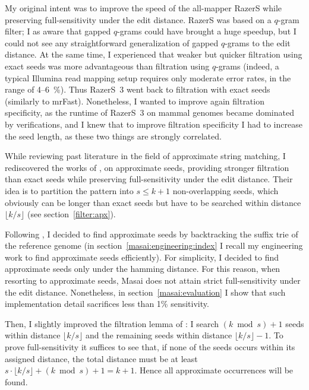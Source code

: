 My original intent was to improve the speed of the all-mapper RazerS \citep{Weese2009} while preserving full-sensitivity under the edit distance.
RazerS was based on a $q$-gram filter;
I as aware that gapped $q$-grams could have brought a huge speedup, but I could not see any straightforward generalization of gapped $q$-grams to the edit distance.
At the same time, I experienced that weaker but quicker filtration using exact seeds was more advantageous than filtration using $q$-grams (indeed, a typical Illumina read mapping setup requires only moderate error rates, in the range of 4--6~\%).
Thus RazerS~3 \citep{Weese2012} went back to filtration with exact seeds (similarly to mrFast).
Nonetheless, I wanted to improve again filtration specificity, as the runtime of RazerS~3 on mammal genomes became dominated by verifications, and I knew that to improve filtration specificity I had to increase the seed length, as these two things are strongly correlated.

While reviewing past literature in the field of approximate string matching, I rediscovered the works of \citeauthor{Myers1994}, \citeauthor{Navarro2000} on approximate seeds, providing stronger filtration than exact seeds while preserving full-sensitivity under the edit distance.
Their idea is to partition the pattern into $s \leq k+1$ non-overlapping seeds, which obviously can be longer than exact seeds but have to be searched within distance $\lfloor k/s \rfloor$ (see section~\ref{filter:apx}).

Following \citep{Navarro2000}, I decided to find approximate seeds by backtracking the suffix trie of the reference genome (in section~\ref{masai:engineering:index} I recall my engineering work to find approximate seeds efficiently).
For simplicity, I decided to find approximate seeds only under the hamming distance.
For this reason, when resorting to approximate seeds, Masai does not attain strict full-sensitivity under the edit distance.
Nonetheless, in section~\ref{masai:evaluation} I show that such implementation detail sacrifices less than 1\% sensitivity.

Then, I slightly improved the filtration lemma of \citep{Navarro2000}:
I search $(k \bmod{s}) + 1$ seeds within distance $\lfloor k/s \rfloor$ and the remaining seeds within distance $\lfloor k/s \rfloor - 1$.
To prove full-sensitivity it suffices to see that, if none of the seeds occurs within its assigned distance, the total distance must be at least $s \cdot \lfloor k/s \rfloor + (k \bmod s) + 1 = k + 1$.
Hence all approximate occurrences will be found.


